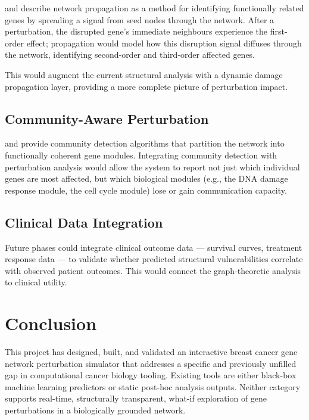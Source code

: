 \documentclass[12pt,a4paper]{report}
\begin{document}
\citet{cowen2017network} and \citet{vanunu2010associating} describe network propagation as a method for identifying functionally related genes by spreading a signal from seed nodes through the network. After a perturbation, the disrupted gene's immediate neighbours experience the first-order effect; propagation would model how this disruption signal diffuses through the network, identifying second-order and third-order affected genes.

This would augment the current structural analysis with a dynamic damage propagation layer, providing a more complete picture of perturbation impact.

\section{Community-Aware Perturbation}

\citet{blondel2008fast} and \citet{newman2006modularity} provide community detection algorithms that partition the network into functionally coherent gene modules. Integrating community detection with perturbation analysis would allow the system to report not just which individual genes are most affected, but which biological modules (e.g., the DNA damage response module, the cell cycle module) lose or gain communication capacity.

\section{Clinical Data Integration}

Future phases could integrate clinical outcome data — survival curves, treatment response data — to validate whether predicted structural vulnerabilities correlate with observed patient outcomes. This would connect the graph-theoretic analysis to clinical utility.

\chapter{Conclusion}

This project has designed, built, and validated an interactive breast cancer gene network perturbation simulator that addresses a specific and previously unfilled gap in computational cancer biology tooling. Existing tools are either black-box machine learning predictors or static post-hoc analysis outputs. Neither category supports real-time, structurally transparent, what-if exploration of gene perturbations in a biologically grounded network.
\end{document}
